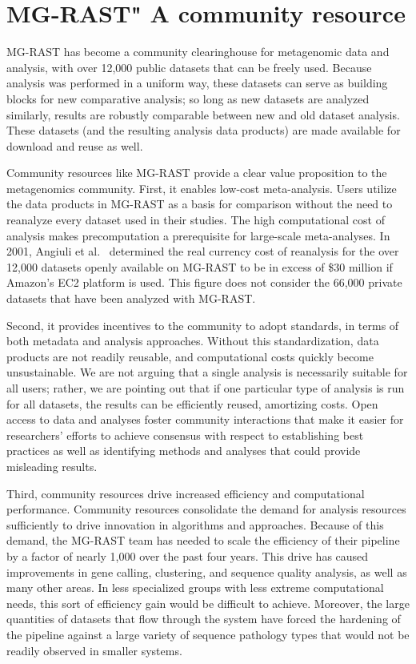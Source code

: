\documentclass[12pt,fullpage]{report}
\begin{document}
\section{MG-RAST" A community resource}
MG-RAST has become a community clearinghouse for metagenomic data and analysis, with over 12,000 public datasets that can be freely used. Because analysis was performed in a uniform way, these datasets can serve as building blocks for new comparative analysis; so long as new datasets are analyzed similarly, results are robustly comparable between new and old dataset analysis. These datasets (and the resulting analysis data products) are made available for download and reuse as well.

Community resources like MG-RAST provide a clear value proposition to the metagenomics community. First, it enables low-cost meta-analysis. Users utilize the data products in MG-RAST as a basis for comparison without the need to reanalyze every dataset used in their studies. The high computational cost of analysis \cite{MGCLOUD} makes precomputation a prerequisite for large-scale meta-analyses. In 2001, Angiuli et al.~\cite{CLOVR} determined the real currency cost of reanalysis for the over 12,000 datasets openly available on MG-RAST to be in excess of \$30 million if Amazon’s EC2 platform is used.
This figure does not consider the 66,000 private datasets that have been analyzed with MG-RAST.

Second, it provides incentives to the community to adopt standards, in terms of both  metadata and analysis approaches. Without this standardization, data products are not readily reusable, and computational costs quickly become unsustainable. We are not arguing that a single analysis is necessarily suitable for all users; rather, we are pointing out that if one particular type of analysis is run for all datasets, the results can be efficiently reused, amortizing costs. Open access to data and analyses foster community interactions that make it easier for researchers’ efforts to achieve consensus with respect to establishing best practices as well as identifying methods and analyses that could provide misleading results.

Third, community resources drive increased efficiency and computational performance. Community resources consolidate the demand for analysis resources sufficiently to drive innovation in algorithms and approaches. Because of this demand, the MG-RAST team has needed to scale the efficiency of their pipeline by a factor of nearly 1,000 over the past four years. This drive has caused improvements in gene calling, clustering, and sequence quality analysis, as well as many other areas. In less specialized groups with less extreme computational needs, this sort of efficiency gain would be difficult to achieve. Moreover, the large quantities of datasets that flow through the system have forced the hardening of the pipeline against a large variety of sequence pathology types that would not be readily observed in smaller systems.
\end{document}
